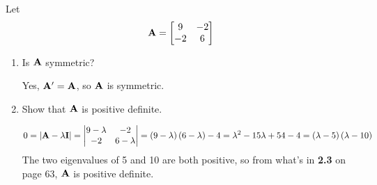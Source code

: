        Let
        \[
            \bold{A} = \begin{bmatrix}
                9 & -2 \\
                -2 & 6
            \end{bmatrix}
        \]
        \begin{enumerate}[label=(\alph*)]
            \item Is $\bold{A}$ symmetric?
            \par
            Yes, $\bold{A}^{\prime} = \bold{A}$, so $\bold{A}$ is symmetric.
            \item Show that $\bold{A}$ is positive definite.
            
            \[
                0 = \left|\bold{A} - \lambda \bold{I}\right| =
                \left|\begin{matrix}
                    9-\lambda & -2 \\
                    -2 & 6-\lambda
                \end{matrix}
                \right| = \left(9 - \lambda\right)\left(6 - \lambda\right) - 4 = \lambda^2 - 15\lambda + 54 - 4 = \left(\lambda - 5\right)\left(\lambda - 10\right)
            \]
        The two eigenvalues of 5 and 10 are both positive, so from what's in \textbf{2.3} on page 63, $\bold{A}$ is positive definite.
        \end{enumerate}